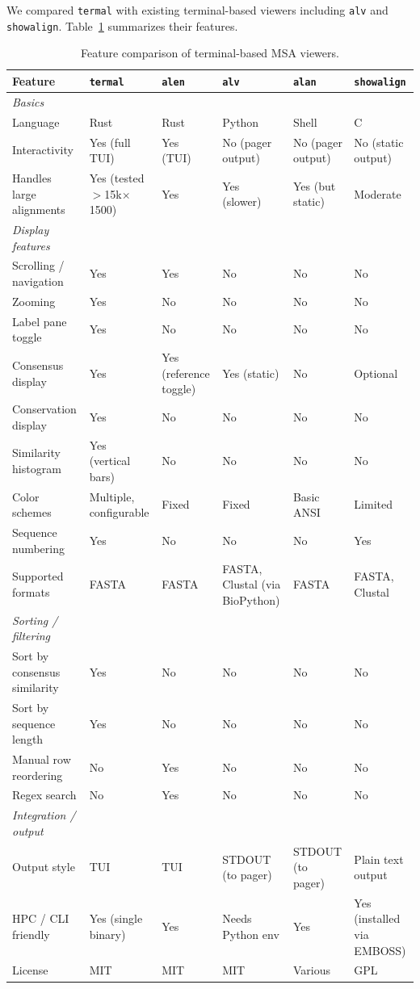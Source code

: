 \documentclass[11pt]{article}
\begin{document}
We compared \texttt{termal} with existing terminal-based viewers including
\texttt{alv} and \texttt{showalign}. Table~\ref{tbl:comparison} summarizes their
features.

\begin{landscape}
\begin{table}[ht]
\centering
\small
\begin{tabularx}{\linewidth}{lXXXXX}
\toprule
\textbf{Feature} & \textbf{\texttt{termal}} & \textbf{\texttt{alen}} & \textbf{\texttt{alv}} & \textbf{\texttt{alan}} & \textbf{\texttt{showalign}} \\
\midrule
\textit{Basics} \\
Language & Rust & Rust & Python & Shell & C \\
Interactivity & Yes (full TUI) & Yes (TUI) & No (pager output) & No (pager output) & No (static output) \\
Handles large alignments & Yes (tested $>$15k$\times$1500) & Yes & Yes (slower) & Yes (but static) & Moderate \\
\midrule
\textit{Display features} \\
Scrolling / navigation & Yes & Yes & No & No & No \\
Zooming & Yes & No & No & No & No \\
Label pane toggle & Yes & No & No & No & No \\
Consensus display & Yes & Yes (reference toggle) & Yes (static) & No & Optional \\
Conservation display & Yes & No & No & No & No \\
Similarity histogram & Yes (vertical bars) & No & No & No & No \\
Color schemes & Multiple, configurable & Fixed & Fixed & Basic ANSI & Limited \\
Sequence numbering & Yes & No & No & No & Yes \\
Supported formats & FASTA & FASTA & FASTA, Clustal (via BioPython) & FASTA & FASTA, Clustal \\
\midrule
\textit{Sorting / filtering} \\
Sort by consensus similarity & Yes & No & No & No & No \\
Sort by sequence length & Yes & No & No & No & No \\
Manual row reordering & No & Yes & No & No & No \\
Regex search & No & Yes & No & No & No \\
\midrule
\textit{Integration / output} \\
Output style & TUI & TUI & STDOUT (to pager) & STDOUT (to pager) & Plain text output \\
HPC / CLI friendly & Yes (single binary) & Yes & Needs Python env & Yes & Yes (installed via EMBOSS) \\
License & MIT & MIT & MIT & Various & GPL \\
\bottomrule
\end{tabularx}
\caption{Feature comparison of terminal-based MSA viewers.}
\label{tbl:comparison}
\end{table}
\end{landscape}
\end{document}
